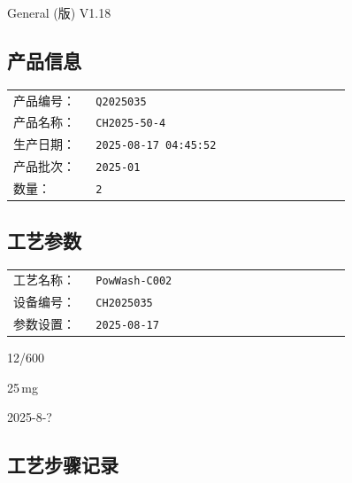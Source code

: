 \documentclass[UTF8,10pt,a4paper,fontset=fandol]{ctexart}
\newcommand{\fieldvalue}[1]{#1}
\newcommand{\handwritten}[1]{#1}
\begin{document}
\noindent
General (版) V1.18

\subsection*{产品信息}

\begin{tabular}{@{}p{0.22\linewidth}p{0.68\linewidth}@{}}
产品编号：&
\texttt{Q2025035}\\
产品名称：&
\texttt{CH2025-50-4}\\
生产日期：&
\texttt{2025-08-17 04:45:52}\\
产品批次：&
\texttt{2025-01}\\
数量：&
\texttt{2}\\
\end{tabular}

\subsection*{工艺参数}

\begin{tabular}{@{}p{0.22\linewidth}p{0.68\linewidth}@{}}
工艺名称：&
\texttt{PowWash-C002}\\
设备编号：&
\texttt{CH2025035}\\
参数设置：&
\texttt{2025-08-17}\\
\end{tabular}

\fieldvalue{\handwritten{12/600}}

\fieldvalue{\handwritten{25\,mg}}

\fieldvalue{\handwritten{2025-8-?}}

\subsection*{工艺步骤记录}
\end{document}
